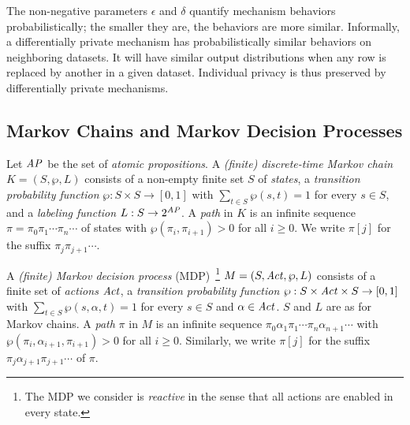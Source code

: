 The non-negative parameters $\epsilon$ and $\delta$ quantify
mechanism behaviors probabilistically;
the smaller they are, the behaviors are more similar.
Informally, a differentially private mechanism has probabilistically
similar behaviors on neighboring datasets. It will have similar
output distributions when any row is replaced by another in a given
dataset. 
Individual privacy is thus preserved by differentially private mechanisms.

\subsection{Markov Chains and Markov Decision Processes}

Let $\mathit{AP}$ be the set of \emph{atomic propositions}.
A \emph{(finite) discrete-time Markov chain} $K = (S, \wp, L)$ consists
of a non-empty finite set $S$ of \emph{states}, a \emph{transition
  probability function} $\wp : S \times S \rightarrow [0, 1]$ with
$\sum_{t \in S} \wp(s, t) = 1$ for every $s \in S$, and
a \emph{labeling function} $L : S \rightarrow 2^{\mathit{AP}}$. A \emph{path}
in $K$ is an infinite sequence $\pi = \pi_0 \pi_1 \cdots \pi_n \cdots$
of states with $\wp (\pi_i, \pi_{i+1}) > 0$ for all $i \geq 0$. We write
$\pi[j]$ for the suffix $\pi_j \pi_{j+1} \cdots$. %

A \emph{(finite) Markov decision process}
(MDP)~\footnote{The MDP we consider is \emph{reactive} in the sense that
all actions are enabled in every state.
}
$M = (S, \mathit{Act}, \wp, L)$ consists
of
a finite set of \emph{actions} $\mathit{Act}$,
a \emph{transition probability function} $\wp : S \times \mathit{Act}
\times S \rightarrow [0, 1]$ with $\sum_{t \in S} \wp(s, \alpha, t)
= 1$ for every $s \in S$ and $\alpha \in \mathit{Act}$. $S$ and
$L$ are as for Markov chains.
A \emph{path} $\pi$ in $M$ is an infinite sequence $\pi_0 \alpha_1
\pi_1 \cdots \pi_n \alpha_{n+1} \cdots$ with
$\wp(\pi_i, \alpha_{i+1}, \pi_{i+1}) > 0$ for all $i \geq 0$.
Similarly, we write $\pi[j]$ for the suffix $\pi_j \alpha_{j+1}
\pi_{j+1} \cdots$ of $\pi$.

